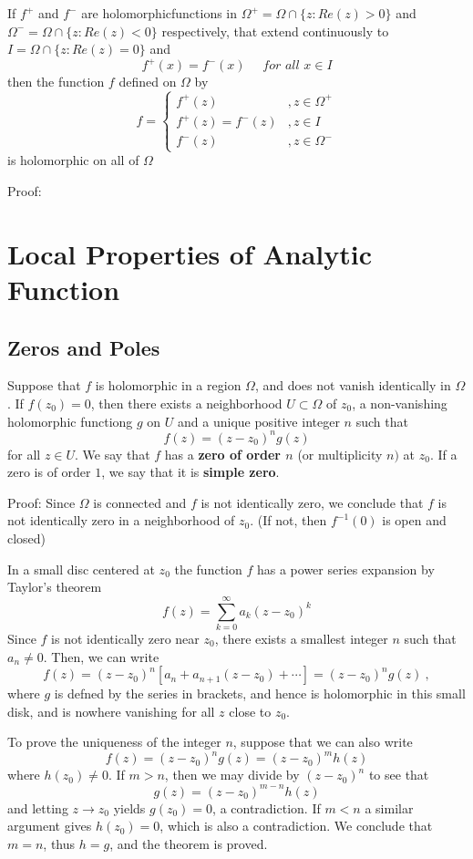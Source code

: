 \documentclass[12pt, oneside]{book}
\begin{document}
\begin{theorem}
    If $f^+$ and $f^-$ are holomorphicfunctions in $\Omega^+=\Omega\cap\{z:Re(z)>0\}$ and $\Omega^-=\Omega\cap\{z:Re(z)<0\}$ respectively, that extend continuously to $I=\Omega\cap\{z:Re(z)=0\}$ and
    $$f^+(x)=f^-(x)\quad\textit{ for all }x\in I$$
    then the function $f$ defined on $\Omega$ by
    $$f=
        \begin{cases}
            f^+(z)        & ,z\in \Omega^+ \\
            f^+(z)=f^-(z) & ,z\in I        \\
            f^-(z)        & ,z\in \Omega^-
        \end{cases}$$
    is holomorphic on all of $\Omega$

    Proof:
\end{theorem}

\section{Local Properties of Analytic Function} %

\subsection{Zeros and Poles}
\begin{theorem}
    Suppose that $f$ is holomorphic in a region $\Omega$,  and does not vanish identically in $\Omega$. If $f(z_0)=0$, then there exists a neighborhood $U \subset \Omega$ of $z_0$,  a non-vanishing holomorphic functiong $g$ on $U$ and a unique positive integer $n$ such that
    $$
        f(z)=(z-z_0)^ng(z)
    $$
    for all $z\in U$. We say that $f$ has a \textbf{zero of order $n$} (or multiplicity $n)$ at $z_0$. If a zero is of order $1$, we say that it is \textbf{simple zero}.

        Proof:
        Since $\Omega$ is connected and $f$ is not identically zero, we conclude that $f$ is not identically zero in a neighborhood of $z_0$. (If not, then $f^{-1}(0)$ is open and closed)

        In a small disc centered at $z_0$ the function $f$ has a power series expansion by Taylor's theorem
    $$f(z)=\sum_{k=0}^\infty a_k(z-z_0)^k$$
    Since $f$ is not identically zero near $z_0$, there exists a smallest integer $n$ such that $a_n\neq 0$. Then, we can write
    $$f(z)=(z-z_0)^n[a_n+a_{n+1}(z-z_0)+\cdots]=(z-z_0)^ng(z)\:,$$
    where $g$ is defned by the series in brackets, and hence is holomorphic in this small disk, and is nowhere vanishing for all $z$ close to $z_0$.

    To prove the uniqueness of the integer $n$, suppose that we can also write
    $$f(z)=(z-z_0)^ng(z)=(z-z_0)^mh(z)$$
    where $h(z_0)\neq0.$ If $m>n$, then we may divide by $(z-z_0)^n$ to see that
    $$g(z)=(z-z_0)^{m-n}h(z)$$
    and letting $z\to z_0$ yields $g(z_0)=0$, a contradiction. If $m<n$ a similar argument gives $h(z_0)=0$, which is also a contradiction. We conclude that $m=n$, thus $h=g$, and the theorem is proved.
\end{theorem}
\end{document}
